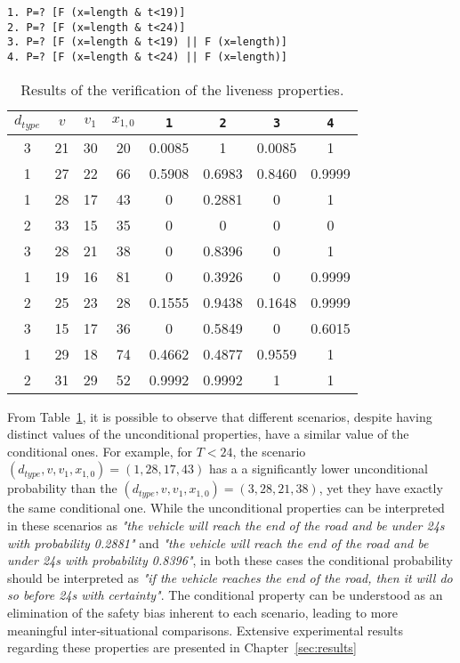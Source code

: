 \begin{minipage}{\linewidth}
{\vspace{1em}
\begin{lstlisting}
1. P=? [F (x=length & t<19)]
2. P=? [F (x=length & t<24)]
3. P=? [F (x=length & t<19) || F (x=length)]
4. P=? [F (x=length & t<24) || F (x=length)]
\end{lstlisting}
}
\end{minipage}

\bgroup
\def\arraystretch{1.3}
\begin{table}[h]
\centering
\begin{tabular}{|c|c|c|c||c|c||c|c|}
\hline
\textbf{$d_{type}$} & \textbf{$v$} & \textbf{$v_1$} & \textbf{$x_{1,0}$} & \texttt{1} & \texttt{2} & \texttt{3} & \texttt{4}  \\ \hline \hline
3 & 21 & 30 & 20 & 0.0085 & 1 & 0.0085 & 1 \\ \hline
1 & 27 & 22 & 66 & 0.5908 & 0.6983 & 0.8460 & 0.9999 \\ \hline
1 & 28 & 17 & 43 & 0 & 0.2881 & 0 & 1 \\ \hline
2 & 33 & 15 & 35 & 0 & 0 & 0 & 0 \\ \hline
3 & 28 & 21 & 38 & 0 & 0.8396 & 0 & 1 \\ \hline
1 & 19 & 16 & 81 & 0 & 0.3926 & 0 & 0.9999 \\ \hline
2 & 25 & 23 & 28 & 0.1555 & 0.9438 & 0.1648 & 0.9999 \\ \hline
3 & 15 & 17 & 36 & 0 & 0.5849 & 0 & 0.6015 \\ \hline
1 & 29 & 18 & 74 & 0.4662 & 0.4877 & 0.9559 & 1 \\ \hline
2 & 31 & 29 & 52 & 0.9992 & 0.9992 & 1 & 1 \\ \hline
\end{tabular}
\caption{Results of the verification of the liveness properties.}
\label{tab:liveness}
\end{table}
\egroup

From Table~\ref{tab:liveness}, it is possible to observe that different scenarios, despite having distinct values of the unconditional properties, have a similar value of the conditional ones. For example, for $T < 24$, the scenario $(d_{type}, v, v_1, x_{1,0}) = (1, 28, 17, 43)$ has a a significantly lower unconditional probability than the $(d_{type}, v, v_1, x_{1,0}) = (3, 28, 21, 38)$, yet they have exactly the same conditional one. While the unconditional properties can be interpreted in these scenarios as \textit{"the vehicle will reach the end of the road and be under 24s with probability 0.2881"} and \textit{"the vehicle will reach the end of the road and be under 24s with probability 0.8396"},  in both these cases the conditional probability should be interpreted as \textit{"if the vehicle reaches the end of the road, then it will do so before 24s with certainty"}. The conditional property can be understood as an elimination of the safety bias inherent to each scenario, leading to more meaningful inter-situational comparisons. Extensive experimental results regarding these properties are presented in Chapter~\ref{sec:results}

